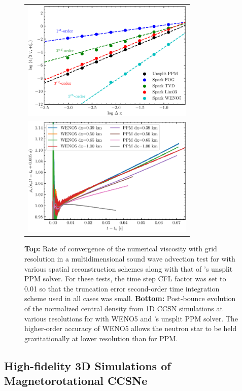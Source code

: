 \begin{figure}
  \begin{tabular}{c}
    \includegraphics[width=3.25in]{figs/convergence}\\
    \includegraphics[width=3.25in]{figs/centralDens}
  \end{tabular}
  \caption{{\bf Top:} Rate of convergence of the numerical viscosity with grid resolution in a multidimensional sound wave advection test for \spark with various spatial reconstruction schemes along with that of \flash's unsplit PPM solver. For these tests, the time step CFL factor was set to 0.01 so that the truncation error second-order time integration scheme used in all cases was small. {\bf Bottom:} Post-bounce evolution of the normalized central density from 1D CCSN simulations at various resolutions for \spark with WENO5 and \flash's unsplit PPM solver.  The higher-order accuracy of WENO5 allows the neutron star to be held gravitationally at lower resolution than for PPM.}
  \label{fig:converge}
\end{figure}

\vspace{0.1in} 

\subsection{High-fidelity 3D Simulations of Magnetorotational CCSNe}
\label{sec:Y1mrccsn}

